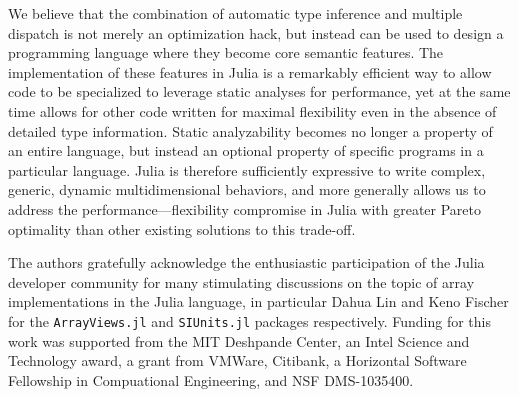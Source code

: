 \documentclass[preprint]{sigplanconf}
\newcommand{\code}[1]{\texttt{#1}}
\begin{document}
We believe that the combination of automatic type inference and multiple
dispatch is not merely an optimization hack, but instead can be used to design
a programming language where they become core semantic features. The
implementation of these features in Julia is a remarkably efficient way to
allow code to be specialized to leverage static analyses for performance, yet
at the same time allows for other code written for maximal flexibility even in
the absence of detailed type information. Static analyzability becomes no
longer a property of an entire language, but instead an optional property of
specific programs in a particular language. Julia is therefore sufficiently
expressive to write complex, generic, dynamic multidimensional behaviors, and
more generally allows us to address the performance---flexibility compromise
in Julia with greater Pareto optimality than other existing solutions to this
trade-off.

%

\acks

The authors gratefully acknowledge the enthusiastic participation of the Julia
developer community for many stimulating discussions on the topic of array
implementations in the Julia language, in particular Dahua Lin and Keno
Fischer for the \code{ArrayViews.jl}\cite{Lin:2014av} and
\code{SIUnits.jl}\cite{Fischer:2014si} packages respectively. Funding for this
work was supported from the MIT Deshpande Center, an Intel Science and
Technology award, a grant from VMWare, Citibank, a Horizontal Software
Fellowship in Compuational Engineering, and NSF DMS-1035400.


{}





\end{document}
